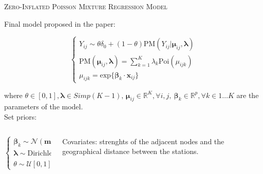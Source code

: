 \documentclass{beamer}
\begin{document}
\begin{frame}{\textsc{Zero-Inflated Poisson Mixture Regression Model}}

Final model proposed in the paper:

\begin{equation}
\begin{cases}

Y_{ij} \sim \theta \delta_{0} + (1 - \theta)\mathrm{PM}(Y_{ij}|\boldsymbol{\mu}_{ij}, \boldsymbol{\lambda}) \\


\mathrm{PM}(\boldsymbol{\mu}_{ij}, \boldsymbol{\lambda}) = \sum_{k=1}^K \lambda_k\mathrm{Poi}(\mu_{ijk})\\
\mu_{ijk} = \mathrm{exp}\{\boldsymbol{\beta}_k\cdot \mathbf{x}_{ij}\}

\end{cases}
\end{equation}

	where $\theta\in[0,1], \boldsymbol{\lambda} \in Simp(K-1), \, \boldsymbol{\mu}_{ij}\in\mathbb{R}^K,\forall i, j, \  \boldsymbol{\beta}_k\in\mathbb{R}^p,\forall k\in 1\dots K$ are the parameters of the model.\\
	Set priors:
\begin{columns}
\begin{column}{.5\textwidth}
\begin{equation}
\begin{cases}

\boldsymbol{\beta}_k \sim \mathcal{N}(\mathbf{m}_0, \Sigma)\\
\boldsymbol{\lambda} \sim \mathrm{Dirichlet}(\alpha)\\
\theta \sim \mathcal{U}[0,1]

\end{cases}
\end{equation}
\end{column}
\begin{column}{.5\textwidth}
	\alert{Covariates}: strenghts of the adjacent nodes and the geographical distance between the stations.
\end{column}
\end{columns}
	
\end{frame}
\end{document}
